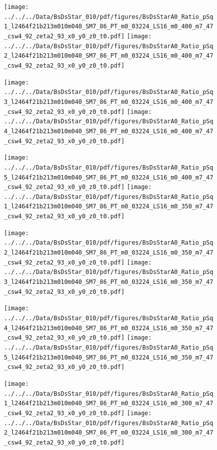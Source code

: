 \documentclass[a4paper,10pt]{article}
\begin{document}
\begin{figure}[p]
 \texttt{[image: ../../../Data/BsDsStar\_010/pdf/figures/BsDsStarA0\_Ratio\_pSq1\_l2464f21b213m010m040\_SM7\_86\_PT\_m0\_03224\_LS16\_m0\_400\_m7\_47\_csw4\_92\_zeta2\_93\_x0\_y0\_z0\_t0.pdf]} 
 \texttt{[image: ../../../Data/BsDsStar\_010/pdf/figures/BsDsStarA0\_Ratio\_pSq2\_l2464f21b213m010m040\_SM7\_86\_PT\_m0\_03224\_LS16\_m0\_400\_m7\_47\_csw4\_92\_zeta2\_93\_x0\_y0\_z0\_t0.pdf]} 
 \end{figure}
\begin{figure}[p]
 \texttt{[image: ../../../Data/BsDsStar\_010/pdf/figures/BsDsStarA0\_Ratio\_pSq3\_l2464f21b213m010m040\_SM7\_86\_PT\_m0\_03224\_LS16\_m0\_400\_m7\_47\_csw4\_92\_zeta2\_93\_x0\_y0\_z0\_t0.pdf]} 
 \texttt{[image: ../../../Data/BsDsStar\_010/pdf/figures/BsDsStarA0\_Ratio\_pSq4\_l2464f21b213m010m040\_SM7\_86\_PT\_m0\_03224\_LS16\_m0\_400\_m7\_47\_csw4\_92\_zeta2\_93\_x0\_y0\_z0\_t0.pdf]} 
 \end{figure}
\begin{figure}[p]
 \texttt{[image: ../../../Data/BsDsStar\_010/pdf/figures/BsDsStarA0\_Ratio\_pSq5\_l2464f21b213m010m040\_SM7\_86\_PT\_m0\_03224\_LS16\_m0\_400\_m7\_47\_csw4\_92\_zeta2\_93\_x0\_y0\_z0\_t0.pdf]} 
 \texttt{[image: ../../../Data/BsDsStar\_010/pdf/figures/BsDsStarA0\_Ratio\_pSq1\_l2464f21b213m010m040\_SM7\_86\_PT\_m0\_03224\_LS16\_m0\_350\_m7\_47\_csw4\_92\_zeta2\_93\_x0\_y0\_z0\_t0.pdf]} 
 \end{figure}
\clearpage
\begin{figure}[p]
 \texttt{[image: ../../../Data/BsDsStar\_010/pdf/figures/BsDsStarA0\_Ratio\_pSq2\_l2464f21b213m010m040\_SM7\_86\_PT\_m0\_03224\_LS16\_m0\_350\_m7\_47\_csw4\_92\_zeta2\_93\_x0\_y0\_z0\_t0.pdf]} 
 \texttt{[image: ../../../Data/BsDsStar\_010/pdf/figures/BsDsStarA0\_Ratio\_pSq3\_l2464f21b213m010m040\_SM7\_86\_PT\_m0\_03224\_LS16\_m0\_350\_m7\_47\_csw4\_92\_zeta2\_93\_x0\_y0\_z0\_t0.pdf]} 
 \end{figure}
\begin{figure}[p]
 \texttt{[image: ../../../Data/BsDsStar\_010/pdf/figures/BsDsStarA0\_Ratio\_pSq4\_l2464f21b213m010m040\_SM7\_86\_PT\_m0\_03224\_LS16\_m0\_350\_m7\_47\_csw4\_92\_zeta2\_93\_x0\_y0\_z0\_t0.pdf]} 
 \texttt{[image: ../../../Data/BsDsStar\_010/pdf/figures/BsDsStarA0\_Ratio\_pSq5\_l2464f21b213m010m040\_SM7\_86\_PT\_m0\_03224\_LS16\_m0\_350\_m7\_47\_csw4\_92\_zeta2\_93\_x0\_y0\_z0\_t0.pdf]} 
 \end{figure}
\begin{figure}[p]
 \texttt{[image: ../../../Data/BsDsStar\_010/pdf/figures/BsDsStarA0\_Ratio\_pSq1\_l2464f21b213m010m040\_SM7\_86\_PT\_m0\_03224\_LS16\_m0\_300\_m7\_47\_csw4\_92\_zeta2\_93\_x0\_y0\_z0\_t0.pdf]} 
 \texttt{[image: ../../../Data/BsDsStar\_010/pdf/figures/BsDsStarA0\_Ratio\_pSq2\_l2464f21b213m010m040\_SM7\_86\_PT\_m0\_03224\_LS16\_m0\_300\_m7\_47\_csw4\_92\_zeta2\_93\_x0\_y0\_z0\_t0.pdf]} 
 \end{figure}
\end{document}
